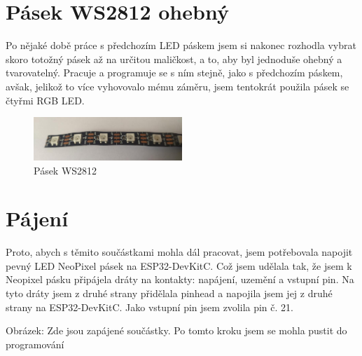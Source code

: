 \newpage

\section{Pásek WS2812 ohebný}
Po nějaké době práce s předchozím LED páskem jsem si nakonec rozhodla vybrat skoro totožný pásek až na určitou maličkost, a to, aby byl jednoduše ohebný a tvarovatelný. Pracuje a programuje se s ním stejně, jako s předchozím páskem, avšak, jelikož to více vyhovovalo mému záměru, jsem tentokrát použila pásek se čtyřmi RGB LED.\cite{Ohebny}

\begin{figure}[htbp]
	\centering
	\includegraphics[width=0.5\textwidth]{img/OhebnyLedPasek2.jpg}
	\caption{Pásek WS2812}
\end{figure}


\section{Pájení}

Proto, abych s těmito součástkami mohla dál pracovat, jsem potřebovala napojit pevný LED NeoPixel pásek na ESP32-DevKitC. Což jsem udělala tak, že jsem k Neopixel pásku připájela dráty na kontakty: napájení, uzemění a vstupní pin. Na tyto dráty jsem z druhé strany přidělala pinhead a napojila jsem jej z druhé strany na ESP32-DevKitC. Jako vstupní pin jsem zvolila pin č. 21.  


Obrázek: 
Zde jsou zapájené součástky. Po tomto kroku jsem se mohla pustit do programování

